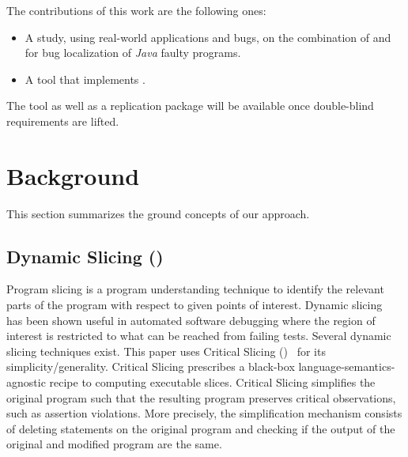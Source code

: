\documentclass{article}
\begin{document}
The contributions of this work are the following ones:
\begin{itemize}
	\item A study, using real-world applications and bugs, on the combination
    of \ds{} and \sfl{} for bug localization of \emph{Java} faulty programs.
   \item A tool that implements \comb{}.
\end{itemize}

The tool as well as a replication package will be available once double-blind
requirements are lifted.

\section{Background}
\label{sec:background}

This section summarizes the ground concepts of our approach.

\subsection{Dynamic Slicing (\ds{})}
\label{sec:slicing}

Program slicing is a program understanding technique to identify the
relevant parts of the program with respect to given points of
interest.  Dynamic
slicing~\cite{Agrawal:1990:DPS:93542.93576}
has been shown useful in automated software debugging where the region
of interest is restricted to what can be reached from failing
tests. Several dynamic slicing techniques exist. This paper uses
Critical Slicing (\cs{})~\cite{DeMillo:1996:CSS:229000.226310} for its
simplicity/generality. Critical Slicing
prescribes a black-box language-semantics-agnostic recipe to computing
executable slices.  Critical Slicing simplifies the original
program such that the resulting program preserves critical
observations, such as assertion violations. More precisely, the
simplification mechanism consists of deleting statements on the
original program and checking if the output of the original and
modified program are the same.
\end{document}
